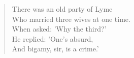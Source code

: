 \begin{verse}
There was an old party of Lyme \\
Who married three wives at one time. \\
\vin When asked: 'Why the third?' \\
\vin He replied: 'One's absurd, \\
And bigamy, sir, is a crime.' \\
\end{verse}
